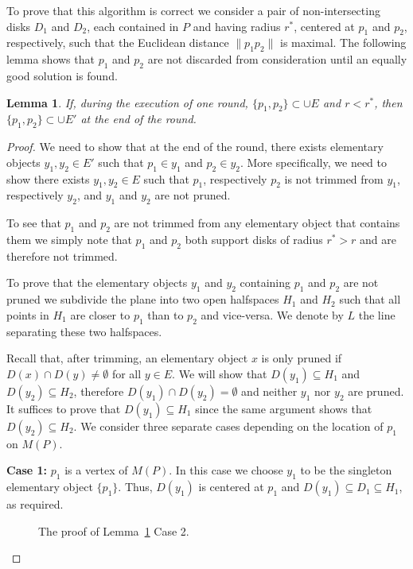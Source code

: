 \documentclass[twoside]{report}
\newtheorem{lem}{Lemma}
\newcommand{\figlabel}[1]{\label{fig:#1}}
\begin{document}
\begin{paper}
To prove that this algorithm is correct we consider a pair of
non-intersecting disks $D_1$ and $D_2$, each contained in $P$ and
having radius $r^*$, centered at $p_1$ and $p_2$, respectively, such
that the Euclidean distance $\|p_1p_2\|$ is maximal. The following lemma
shows that $p_1$ and $p_2$ are not discarded from consideration until
an equally good solution is found.

\begin{lem}
  \label{l:correct} If, during the execution of one round,
  $\{p_1,p_2\} \subset \cup E$ and $r<r^*$, then $\{p_1,p_2\} \subset
  \cup E'$ at the end of the round.
\end{lem}

\begin{proof}
  We need to show that at the end of the round, there exists
  elementary objects $y_1,y_2\in E'$ such that $p_1\in y_1$ and
  $p_2\in y_2$.  More specifically, we need to show there exists
  $y_1,y_2\in E$ such that $p_1$, respectively $p_2$ is not trimmed
  from $y_1$, respectively $y_2$, and $y_1$ and $y_2$ are not pruned.
  
  To see that $p_1$ and $p_2$ are not trimmed from any elementary
  object that contains them we simply note that $p_1$ and $p_2$ both
  support disks of radius $r^*> r$ and are therefore not trimmed.
  
  To prove that the elementary objects $y_1$ and $y_2$ containing $p_1$ and
  $p_2$ are not pruned we subdivide the plane into two open halfspaces $H_1$
  and $H_2$ such that all points in $H_1$ are closer to $p_1$ than to $p_2$ and
  vice-versa. We denote by $L$ the line separating these two halfspaces.
  
  Recall that, after trimming, an elementary object $x$ is only pruned
  if $D(x)\cap D(y)\neq\emptyset$ for all $y\in E$.  We will show that
  $D(y_1)\subseteq H_1$ and $D(y_2)\subseteq H_2$, therefore
  $D(y_1)\cap D(y_2)=\emptyset$ and neither $y_1$ nor $y_2$ are
  pruned.  It suffices to prove that $D(y_1)\subseteq H_1$ since the
  same argument shows that $D(y_2)\subseteq H_2$.  We consider three
  separate cases depending on the location of $p_1$ on $M(P)$.

  \noindent\textbf{Case 1:} 
  $p_1$ is a vertex of $M(P)$. In this case we choose $y_1$ to be the
  singleton elementary object $\{p_1\}$. Thus, $D(y_1)$ is centered
  at $p_1$ and $D(y_1)\subseteq D_1\subseteq H_1$, as required. 
  
  \begin{figure}
    \begin{center}
      \end{center}
    \caption{The proof of Lemma~\ref{l:correct} Case 2.}
    \figlabel{case2}
  \end{figure}
 

\end{proof}
\end{paper}
\end{document}
